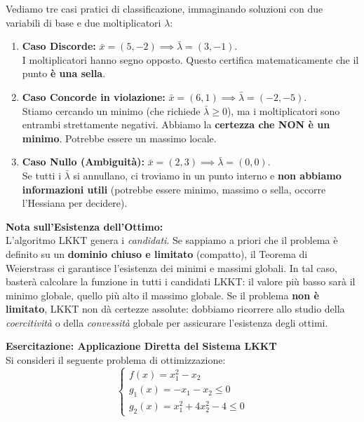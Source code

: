 \documentclass[12pt, a4paper]{article}
\newcommand{\separatore}{\noindent{\color{titlecolor!50}\rule{\textwidth}{0.6pt}}}
\begin{document}
	Vediamo tre casi pratici di classificazione, immaginando soluzioni con due variabili di base e due moltiplicatori $\lambda$:
	\begin{enumerate}
		\item \textbf{Caso Discorde:} $\bar{x} = (5, -2) \implies \bar{\lambda} = (3, -1)$. \\
		I moltiplicatori hanno segno opposto. Questo certifica matematicamente che il punto \textbf{è una sella}. 
		
		\item \textbf{Caso Concorde in violazione:} $\bar{x} = (6, 1) \implies \bar{\lambda} = (-2, -5)$. \\
		Stiamo cercando un minimo (che richiede $\bar{\lambda} \ge 0$), ma i moltiplicatori sono entrambi strettamente negativi. Abbiamo la \textbf{certezza che NON è un minimo}. Potrebbe essere un massimo locale.
		
		\item \textbf{Caso Nullo (Ambiguità):} $\bar{x} = (2, 3) \implies \bar{\lambda} = (0, 0)$. \\
		Se tutti i $\bar{\lambda}$ si annullano, ci troviamo in un punto interno e \textbf{non abbiamo informazioni utili} (potrebbe essere minimo, massimo o sella, occorre l'Hessiana per decidere).
	\end{enumerate}
	
	\textbf{Nota sull'Esistenza dell'Ottimo:}\\
	L'algoritmo LKKT genera i \textit{candidati}. Se sappiamo a priori che il problema è definito su un \textbf{dominio chiuso e limitato} (compatto), il Teorema di Weierstrass ci garantisce l'esistenza dei minimi e massimi globali. In tal caso, basterà calcolare la funzione in tutti i candidati LKKT: il valore più basso sarà il minimo globale, quello più alto il massimo globale.
	Se il problema \textbf{non è limitato}, LKKT non dà certezze assolute: dobbiamo ricorrere allo studio della \textit{coercitività} o della \textit{convessità} globale per assicurare l'esistenza degli ottimi.
	
	\vspace{0.6cm}
	\separatore
	\vspace{0.4cm}
	
	\textbf{Esercitazione: Applicazione Diretta del Sistema LKKT}\\[0.2cm]
	Si consideri il seguente problema di ottimizzazione:
	\[
	\begin{cases}
		f(x) = x_1^2 - x_2 \\
		g_1(x) = -x_1 - x_2 \le 0 \\
		g_2(x) = x_1^2 + 4x_2^2 - 4 \le 0
	\end{cases}
	\]
	
\end{document}
